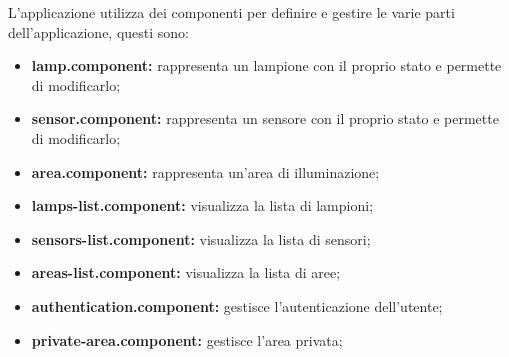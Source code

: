 L'applicazione utilizza dei componenti per definire e gestire le varie parti dell'applicazione, questi sono:
\begin{itemize}
    \item \textbf{lamp.component:} rappresenta un lampione con il proprio stato e permette di modificarlo;
    \item \textbf{sensor.component:} rappresenta un sensore con il proprio stato e permette di modificarlo;
    \item \textbf{area.component:} rappresenta un'area di illuminazione;
    \item \textbf{lamps-list.component:} visualizza la lista di lampioni;
    \item \textbf{sensors-list.component:} visualizza la lista di sensori;
    \item \textbf{areas-list.component:} visualizza la lista di aree;
    \item \textbf{authentication.component:} gestisce l'autenticazione dell'utente;
    \item \textbf{private-area.component:} gestisce l'area privata;
\end{itemize}